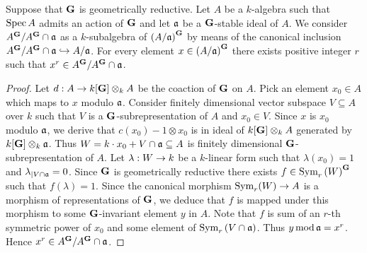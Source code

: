 \begin{theorem}\label{theorem:surogate_linear_reductivity}
Suppose that $\mathbf{G}$ is geometrically reductive. Let $A$ be a $k$-algebra such that $\mathrm{Spec}\, A$ admits an action of $\mathbf{G}$ and let $\mathfrak{a}$ be a $\mathbf{G}$-stable ideal of $A$. We consider $A^{\mathbf{G}}/A^{\mathbf{G}}\cap \mathfrak{a}$ as a $k$-subalgebra of $\left(A/\mathfrak{a}\right)^{\mathbf{G}}$ by means of the canonical inclusion $A^{\mathbf{G}}/A^{\mathbf{G}}\cap \mathfrak{a} \hookrightarrow A/\mathfrak{a}$. For every element $x \in \left(A/\mathfrak{a}\right)^{\mathbf{G}}$ there exists positive integer $r$ such that $x^r \in A^{\mathbf{G}}/A^{\mathbf{G}}\cap \mathfrak{a}$.
\end{theorem}
\begin{proof}
Let $d:A\rightarrow k[\mathbf{G}]\otimes_kA$ be the coaction of $\mathbf{G}$ on $A$. Pick an element $x_0\in A$ which maps to $x$ modulo $\mathfrak{a}$. Consider finitely dimensional vector subspace $V\subseteq A$ over $k$ such that $V$ is a $\mathbf{G}$-subrepresentation of $A$ and $x_0\in V$. Since $x$ is $x_0$ modulo $\mathfrak{a}$, we derive that $c(x_0) - 1\otimes x_0$ is in ideal of $k[\mathbf{G}]\otimes_kA$ generated by $k[\mathbf{G}]\otimes_k\mathfrak{a}$. Thus $W = k\cdot x_0+V\cap \mathfrak{a}\subseteq A$ is finitely dimensional $\mathbf{G}$-subrepresentation of $A$. Let $\lambda:W\rightarrow k$ be a $k$-linear form such that $\lambda(x_0) = 1$ and $\lambda_{\mid V\cap \mathfrak{a}} = 0$. Since $\mathbf{G}$ is geometrically reductive there exists $f\in \textrm{Sym}_r\left(W\right)^{\mathbf{G}}$ such that $f(\lambda) = 1$. Since the canonical morphism $\textrm{Sym}_r(W)\rightarrow A$ is a morphism of representations of $\mathbf{G}$, we deduce that $f$ is mapped under this morphism to some $\mathbf{G}$-invariant element $y$ in $A$. Note that $f$ is sum of an $r$-th symmetric power of $x_0$ and some element of $\textrm{Sym}_r\left(V\cap \mathfrak{a}\right)$. Thus $y\,\mathrm{mod}\,\mathfrak{a} = x^r$. Hence $x^r \in A^{\mathbf{G}}/A^{\mathbf{G}}\cap \mathfrak{a}$.
\end{proof}

